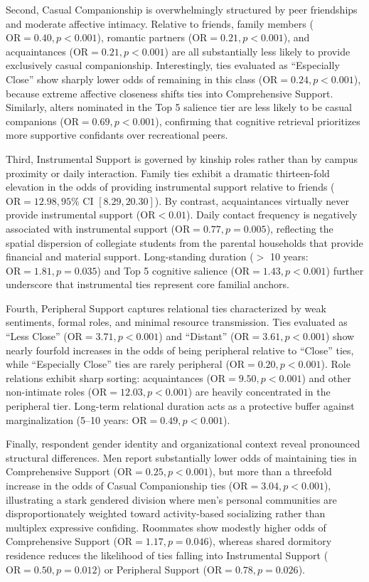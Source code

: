 \documentclass[12pt]{article}
\begin{document}
Second, Casual Companionship is overwhelmingly structured by peer friendships and moderate affective intimacy. Relative to friends, family members ($\text{OR} = 0.40, p < 0.001$), romantic partners ($\text{OR} = 0.21, p < 0.001$), and acquaintances ($\text{OR} = 0.21, p < 0.001$) are all substantially less likely to provide exclusively casual companionship. Interestingly, ties evaluated as ``Especially Close'' show sharply lower odds of remaining in this class ($\text{OR} = 0.24, p < 0.001$), because extreme affective closeness shifts ties into Comprehensive Support. Similarly, alters nominated in the Top 5 salience tier are less likely to be casual companions ($\text{OR} = 0.69, p < 0.001$), confirming that cognitive retrieval prioritizes more supportive confidants over recreational peers.

Third, Instrumental Support is governed by kinship roles rather than by campus proximity or daily interaction. Family ties exhibit a dramatic thirteen-fold elevation in the odds of providing instrumental support relative to friends ($\text{OR} = 12.98, 95\%\text{ CI } [8.29, 20.30]$). By contrast, acquaintances virtually never provide instrumental support ($\text{OR} < 0.01$). Daily contact frequency is negatively associated with instrumental support ($\text{OR} = 0.77, p = 0.005$), reflecting the spatial dispersion of collegiate students from the parental households that provide financial and material support. Long-standing duration ($>$ 10 years: $\text{OR} = 1.81, p = 0.035$) and Top 5 cognitive salience ($\text{OR} = 1.43, p < 0.001$) further underscore that instrumental ties represent core familial anchors.

Fourth, Peripheral Support captures relational ties characterized by weak sentiments, formal roles, and minimal resource transmission. Ties evaluated as ``Less Close'' ($\text{OR} = 3.71, p < 0.001$) and ``Distant'' ($\text{OR} = 3.61, p < 0.001$) show nearly fourfold increases in the odds of being peripheral relative to ``Close'' ties, while ``Especially Close'' ties are rarely peripheral ($\text{OR} = 0.20, p < 0.001$). Role relations exhibit sharp sorting: acquaintances ($\text{OR} = 9.50, p < 0.001$) and other non-intimate roles ($\text{OR} = 12.03, p < 0.001$) are heavily concentrated in the peripheral tier. Long-term relational duration acts as a protective buffer against marginalization (5--10 years: $\text{OR} = 0.49, p < 0.001$).

Finally, respondent gender identity and organizational context reveal pronounced structural differences. Men report substantially lower odds of maintaining ties in Comprehensive Support ($\text{OR} = 0.25, p < 0.001$), but more than a threefold increase in the odds of Casual Companionship ties ($\text{OR} = 3.04, p < 0.001$), illustrating a stark gendered division where men's personal communities are disproportionately weighted toward activity-based socializing rather than multiplex expressive confiding. Roommates show modestly higher odds of Comprehensive Support ($\text{OR} = 1.17, p = 0.046$), whereas shared dormitory residence reduces the likelihood of ties falling into Instrumental Support ($\text{OR} = 0.50, p = 0.012$) or Peripheral Support ($\text{OR} = 0.78, p = 0.026$).
\end{document}
